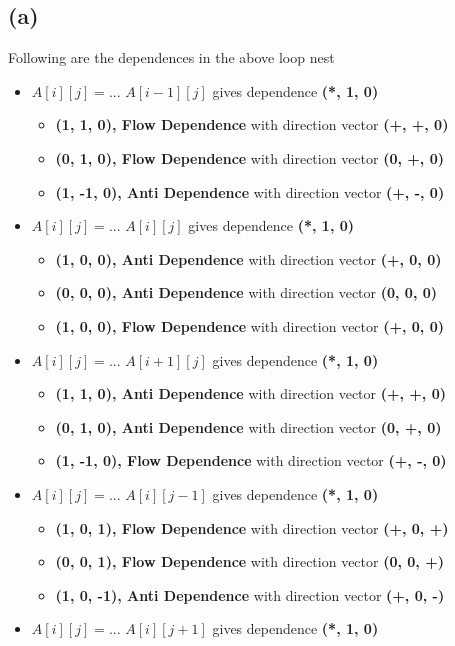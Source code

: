 \documentclass[a4paper]{article}
\begin{document}
\subsection{(a)} Following are the dependences in the above loop nest
\begin{itemize}
\item $A[i][j] = ... \,\, A[i-1][j]$ gives dependence {\bf (*, 1, 0)}
	\begin{itemize}
	\item {\bf (1, 1, 0), Flow Dependence} with direction vector {\bf (+, +, 0)}
	\item {\bf (0, 1, 0), Flow Dependence} with direction vector {\bf (0, +, 0)}
	\item {\bf (1, -1, 0), Anti Dependence} with direction vector {\bf (+, -, 0)}
	\end{itemize}
\item $A[i][j] = ... \,\, A[i][j]$ gives dependence {\bf (*, 1, 0)}
	\begin{itemize}
	\item {\bf (1, 0, 0), Anti Dependence} with direction vector {\bf (+, 0, 0)}
	\item {\bf (0, 0, 0), Anti Dependence} with direction vector {\bf (0, 0, 0)}
	\item {\bf (1, 0, 0), Flow Dependence} with direction vector {\bf (+, 0, 0)}
	\end{itemize}
\item $A[i][j] = ... \,\, A[i+1][j]$ gives dependence {\bf (*, 1, 0)}
	\begin{itemize}
	\item {\bf (1, 1, 0), Anti Dependence} with direction vector {\bf (+, +, 0)}
	\item {\bf (0, 1, 0), Anti Dependence} with direction vector {\bf (0, +, 0)}
	\item {\bf (1, -1, 0), Flow Dependence} with direction vector {\bf (+, -, 0)}
	\end{itemize}
\item $A[i][j] = ... \,\, A[i][j-1]$ gives dependence {\bf (*, 1, 0)}
	\begin{itemize}
	\item {\bf (1, 0, 1), Flow Dependence} with direction vector {\bf (+, 0, +)}
	\item {\bf (0, 0, 1), Flow Dependence} with direction vector {\bf (0, 0, +)}
	\item {\bf (1, 0, -1), Anti Dependence} with direction vector {\bf (+, 0, -)}
	\end{itemize}
\item $A[i][j] = ... \,\, A[i][j+1]$ gives dependence {\bf (*, 1, 0)}

\end{itemize}
\end{document}
